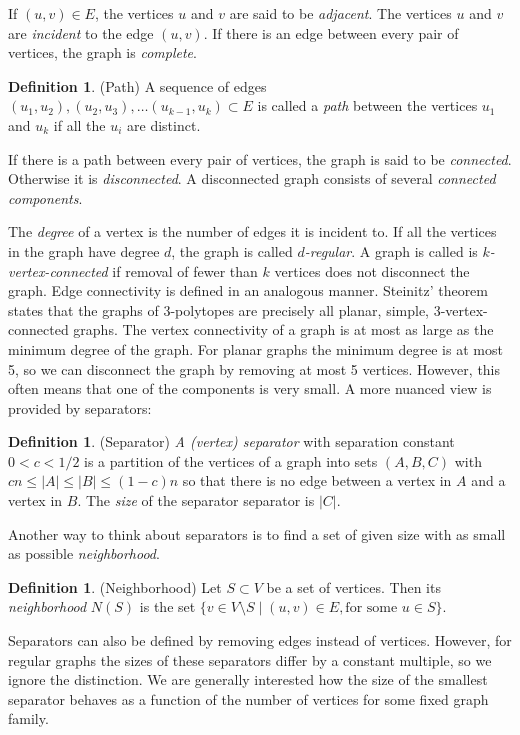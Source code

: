 \documentclass[a4paper,12pt]{book}
\theoremstyle{plain}
\theoremstyle{definition}
\newtheorem{definition}[theorem]{Definition}
\begin{document}
If $(u,v) \in E$, the vertices $u$ and $v$ are said to be \textit{adjacent}. 
The vertices $u$ and $v$ are \textit{incident} to the edge $(u,v)$. If there is an edge
between every pair of vertices, the graph is \textit{complete}.
\begin{definition}
 (Path) A sequence of edges $(u_1, u_2), (u_2, u_3), \dots (u_{k-1}, u_k) \subset E$ 
is called a \emph{path} between the vertices $u_1$ and $u_k$ if all the $u_i$ are 
distinct.
\end{definition}
If there is a path between every pair of vertices, the graph is said to be 
\textit{connected}. Otherwise it is \textit{disconnected}. A disconnected graph 
consists of several \textit{connected components}.


The \textit{degree} of a vertex is the number of edges it is incident to. 
If all the vertices in the graph have degree $d$, the graph is called 
\emph{$d$-regular}. A graph is called is \emph{$k$-vertex-connected} if removal of fewer than 
$k$ vertices does not disconnect the graph. Edge connectivity is defined in an 
analogous manner. Steinitz' theorem states that the graphs of 
3-polytopes are precisely all planar, simple, 3-vertex-connected graphs. The vertex connectivity
of a graph is at most as large as the minimum degree of the graph. For planar graphs the minimum degree
is at most 5, so we can disconnect the graph by removing at most 5 vertices. However, this
often means that one of the components is very small. A more nuanced view is 
provided 
by separators:

\begin{definition}
(Separator) \emph{A (vertex) separator} with separation constant $0<c<1/2$ is a 
partition of the vertices of a graph into 
sets $(A,B,C)$  with $cn \le |A| \le |B| \le (1-c)n$ so that there is no edge between 
a vertex in $A$ and a vertex in $B$. The \textit{size} of the separator
separator is $|C|$.  
\end{definition}

Another way to think about separators is to find a set of given size with as small
as possible \textit{neighborhood}.

\begin{definition}
 (Neighborhood) Let $S \subset V$ be a set of vertices. Then its \emph{neighborhood} 
$N(S)$ is the set $\{v \in V\setminus S \mid (u,v) \in E, \textrm{for some } u \in S\}$. 
\end{definition}

Separators can also be defined by removing edges instead of vertices. However, 
for regular graphs the sizes of these separators differ by a constant multiple,
so we ignore the distinction.
We are generally interested how the size of the smallest separator behaves as a 
function 
of the number of vertices for some fixed graph family.
\end{document}
